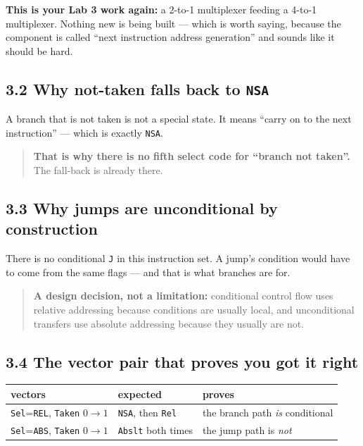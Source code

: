 \documentclass[11pt]{article}
\newcommand{\code}[1]{\texttt{#1}}
\begin{document}
\textbf{This is your Lab 3 work again:} a 2-to-1 multiplexer feeding a 4-to-1
multiplexer. Nothing new is being built --- which is worth saying, because the
component is called ``next instruction address generation'' and sounds like it
should be hard.

\subsection*{3.2 Why not-taken falls back to \code{NSA}}

A branch that is not taken is not a special state. It means ``carry on to the next
instruction'' --- which is exactly \code{NSA}.

\begin{quote}
\textbf{That is why there is no fifth select code for ``branch not taken''.} The
fall-back is already there.
\end{quote}

\subsection*{3.3 Why jumps are unconditional by construction}

There is no conditional \code{J} in this instruction set. A jump's condition would
have to come from the same flags --- and that is what branches are for.

\begin{quote}
\textbf{A design decision, not a limitation:} conditional control flow uses
relative addressing because conditions are usually local, and unconditional
transfers use absolute addressing because they usually are not.
\end{quote}

\subsection*{3.4 The vector pair that proves you got it right}

\begin{center}
\begin{tabular}{lll}
\toprule
vectors & expected & proves \\
\midrule
\code{Sel}=\code{REL}, \code{Taken} $0 \to 1$ & \code{NSA}, then \code{Rel} & the branch path \emph{is} conditional \\
\code{Sel}=\code{ABS}, \code{Taken} $0 \to 1$ & \code{Abslt} both times & the jump path is \emph{not} \\
\bottomrule
\end{tabular}
\end{center}
\end{document}
